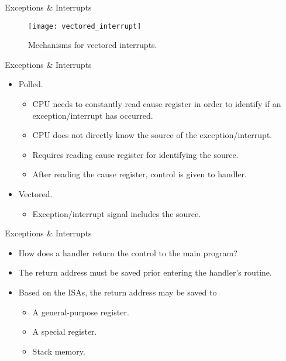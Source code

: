 % 
\begin{frame}{Exceptions \& Interrupts}{}
\begin{figure}
\centering
\texttt{[image: vectored\_interrupt]}
\caption{Mechanisms for vectored interrupts.}
\label{Figure:vectored_interrupt}
\end{figure}
\end{frame}


% 
\begin{frame}{Exceptions \& Interrupts}{}
\begin{itemize}
  \item Polled.
  \begin{itemize}
    \item \ac{CPU} needs to constantly read cause register in order to identify if an exception/interrupt has occurred.
    \item \ac{CPU} does not directly know the source of the exception/interrupt.
    \item Requires reading cause register for identifying the source.
    \item After reading the cause register, control is given to handler.
  \end{itemize}
  \item Vectored.
    \begin{itemize}
    \item Exception/interrupt signal includes the source.
    \end{itemize} 
\end{itemize} 
\end{frame}

% 
\begin{frame}{Exceptions \& Interrupts}{}
\begin{itemize}
\item How does a handler return the control to the main program?
\pauseprint
\item The return address must be saved prior entering the handler's routine.
\item Based on the \acp{ISA}, the return address may be saved to
\begin{itemize}
\item A general-purpose register.
\item A special register.
\item Stack memory.
\end{itemize} 

\end{itemize}
\end{frame}


